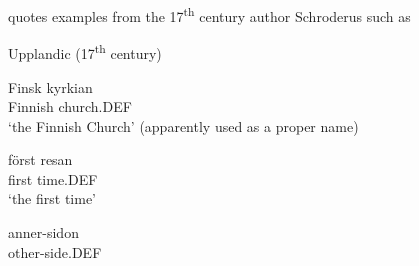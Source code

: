 
\citet[523]{Hesselman1908} quotes examples from the 17\textsuperscript{th} century author Schroderus such as


\item 

Upplandic (17\textsuperscript{th} century)



\item 


 \ea\label{}
\gll Finsk  kyrkian\\


Finnish  church.DEF\\

\glt ‘the Finnish Church’ (apparently used as a proper name)

\z

\item 


 \ea\label{}
\gll först  resan\\


first  time.DEF\\

\glt  ‘the first time’

\z

\item 


 \ea\label{}
\gll anner-sidon\\


other-side.DEF\\

